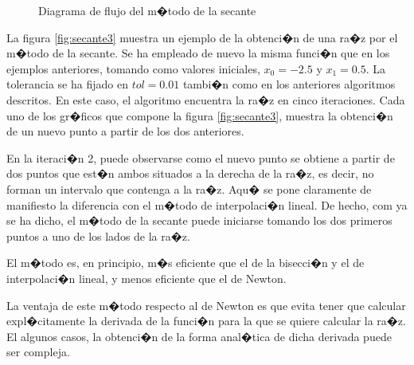 \begin{figure}[h]
\centering
{}
\caption{Diagrama de flujo del m�todo de la secante}
\label{fig:secante2}
\end{figure}

La figura \ref{fig:secante3} muestra un ejemplo de la obtenci�n de una ra�z por el m�todo de la secante. Se ha empleado de nuevo la misma funci�n que en los ejemplos anteriores, tomando como valores iniciales, $x_0=-2.5$ y $x_1=0.5$. La tolerancia se ha fijado en $tol=0.01$ tambi�n como en los anteriores algoritmos descritos. En este caso, el algoritmo encuentra la ra�z en cinco iteraciones. Cada uno de los gr�ficos que compone la figura \ref{fig:secante3}, muestra la obtenci�n de un nuevo punto a partir de los dos anteriores. 

En la iteraci�n 2, puede observarse como el nuevo punto se obtiene a partir de dos puntos que est�n ambos situados a la derecha de la ra�z, es decir, no forman un intervalo que contenga a la ra�z.  Aqu� se pone claramente de manifiesto la diferencia con el m�todo de interpolaci�n lineal. De hecho, com ya se ha dicho, el m�todo de la secante puede iniciarse tomando los dos primeros puntos a uno de los lados de la ra�z.

 El m�todo es, en principio, m�s eficiente que el de la bisecci�n y el de interpolaci�n lineal, y menos eficiente que el de Newton.

La ventaja de este m�todo respecto al de Newton es que evita tener que calcular expl�citamente la derivada de la funci�n para la que se quiere calcular la ra�z. El algunos casos, la obtenci�n de la forma anal�tica de dicha derivada puede ser compleja.   


